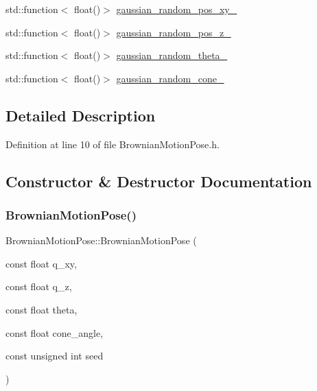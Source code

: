 \begin{DoxyCompactItemize}
std\+::function$<$ float()$>$ \hyperlink{classBrownianMotionPose_a3b9538edc2fe02b6ec1621b8f65d47d9}{gaussian\+\_\+random\+\_\+pos\+\_\+xy\+\_\+}
\item 
std\+::function$<$ float()$>$ \hyperlink{classBrownianMotionPose_ab1115a94b9b81cb8aa746327086d72ca}{gaussian\+\_\+random\+\_\+pos\+\_\+z\+\_\+}
\item 
std\+::function$<$ float()$>$ \hyperlink{classBrownianMotionPose_ab4b2cafbf5d974432290016236946356}{gaussian\+\_\+random\+\_\+theta\+\_\+}
\item 
std\+::function$<$ float()$>$ \hyperlink{classBrownianMotionPose_a7381aa317a5f4b3fe5420d9b67a09b48}{gaussian\+\_\+random\+\_\+cone\+\_\+}
\end{DoxyCompactItemize}


\subsection{Detailed Description}


Definition at line 10 of file Brownian\+Motion\+Pose.\+h.



\subsection{Constructor \& Destructor Documentation}
\mbox{\label{classBrownianMotionPose_afb57354af3029be488d8416733fbc876}} 
\subsubsection{\texorpdfstring{Brownian\+Motion\+Pose()}{BrownianMotionPose()}\hspace{0.1cm}{\footnotesize\ttfamily [1/5]}}
{\footnotesize\ttfamily Brownian\+Motion\+Pose\+::\+Brownian\+Motion\+Pose (\begin{DoxyParamCaption}\item[{const float}]{q\+\_\+xy,  }\item[{const float}]{q\+\_\+z,  }\item[{const float}]{theta,  }\item[{const float}]{cone\+\_\+angle,  }\item[{const unsigned int}]{seed }\end{DoxyParamCaption})\hspace{0.3cm}{\ttfamily [noexcept]}}



